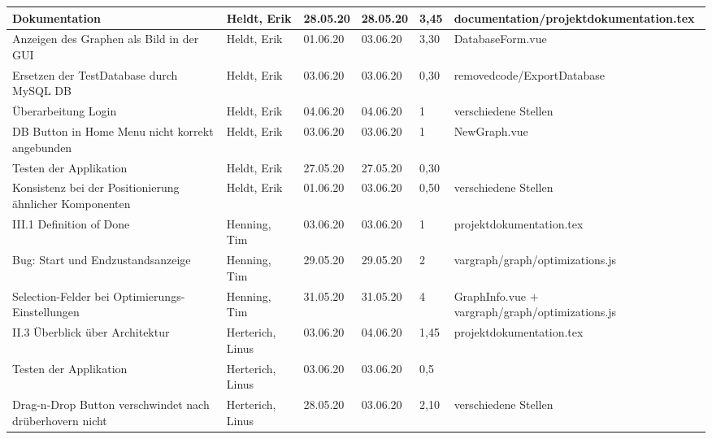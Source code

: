 \begin{longtable}{|p{4cm}|p{2cm}|p{1.2cm}|p{1.2cm}|p{0.7cm}|p{3.8cm}|}
  
  Dokumentation                                                         & Heldt, Erik           & 28.05.20 & 28.05.20 & 3,45  & documentation/projektdokumentation.tex                                                \\ \hline
  Anzeigen des Graphen als Bild in der GUI                              & Heldt, Erik           & 01.06.20 & 03.06.20 & 3,30  & DatabaseForm.vue                                              \\ \hline
  Ersetzen der TestDatabase durch MySQL DB                              & Heldt, Erik           & 03.06.20 & 03.06.20 & 0,30  & removedcode/ExportDatabase                                              \\ \hline
  Überarbeitung Login                                                   & Heldt, Erik           & 04.06.20 & 04.06.20 & 1     & verschiedene Stellen                                            \\ \hline
  DB Button in Home Menu nicht korrekt angebunden                       & Heldt, Erik           & 03.06.20 & 03.06.20 & 1     & NewGraph.vue                                            \\ \hline
  Testen der Applikation                                                & Heldt, Erik           & 27.05.20 & 27.05.20 & 0,30  &                                                    \\ \hline
  Konsistenz bei der Positionierung ähnlicher Komponenten               & Heldt, Erik           & 01.06.20 & 03.06.20 & 0,50  & verschiedene Stellen                                      \\ \hline

  III.1 Definition of Done                                              & Henning, Tim          & 03.06.20 & 03.06.20 & 1     & projektdokumentation.tex                                             \\ \hline
  Bug: Start und Endzustandsanzeige                                     & Henning, Tim          & 29.05.20 & 29.05.20 & 2     & vargraph/graph/optimizations.js                                                   \\ \hline
  Selection-Felder bei Optimierungs-Einstellungen                       & Henning, Tim          & 31.05.20 & 31.05.20 & 4     & GraphInfo.vue $+$ vargraph/graph/optimizations.js                                          \\ \hline

  II.3 Überblick über Architektur                                       & Herterich, Linus      & 03.06.20 & 04.06.20 & 1,45  & projektdokumentation.tex                                             \\ \hline
  Testen der Applikation                                                & Herterich, Linus      & 03.06.20 & 03.06.20 & 0,5   &                                           \\ \hline
  Drag-n-Drop Button verschwindet nach drüberhovern nicht               & Herterich, Linus      & 28.05.20 & 03.06.20 & 2,10  & verschiedene Stellen                                          \\ \hline
  

\end{longtable}
